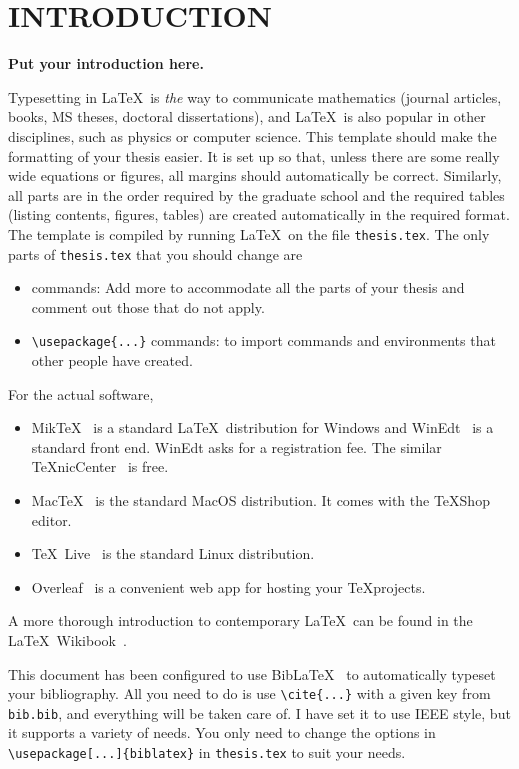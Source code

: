 
\chapter{INTRODUCTION}\label{chap1:introduction}

{\bf Put your introduction here.}


Typesetting in \LaTeX \ is {\em the} way to communicate mathematics
(journal articles, books, MS theses, doctoral dissertations),
and \LaTeX \ is also popular in other disciplines, such as 
physics or computer science. This template should make the formatting
of your thesis easier. It is set up so that, unless there are some really
wide equations or figures, all margins should automatically be correct.
Similarly, all parts are in the order required by the graduate school and 
the required tables (listing contents, figures, tables)
are created automatically in the required format. 
The template is compiled by running \LaTeX \ on 
the file \verb+thesis.tex+. The only parts of 
\verb+thesis.tex+ that you should change are
\begin{itemize}
	\item \verb++ commands: Add more to accommodate all the
	parts of your thesis and comment out those that do not apply. 
	\item \verb+\usepackage{...}+ commands: to import commands
	and environments that other people have created.
\end{itemize}

\newpage
For the actual software,
\begin{itemize}
	\item Mik\TeX~\cite{MiKTeX}
	is a standard \LaTeX\ distribution for Windows and
	WinEdt~\cite{WinEdt} is a standard front end.
	WinEdt asks for a registration fee. 
	The similar \TeX nicCenter~\cite{TeXnicCenter}
	is free. 
	\item Mac\TeX~\cite{MacTeX} is the standard MacOS distribution.
	It comes with the \TeX Shop editor.
	\item \TeX\ Live~\cite{TeXLive} is the standard Linux distribution.
	\item Overleaf~\cite{overleaf} is a convenient web app for hosting your
	\TeX projects.
\end{itemize}
A more thorough introduction to contemporary \LaTeX\ can be
found in the \LaTeX\ Wikibook~\cite{Wikibook}.

This document has been configured to use Bib\LaTeX~\cite{biblatex} to
automatically typeset your bibliography. All you need to do is use
\verb+\cite{...}+ with a given key from \verb+bib.bib+, and everything
will be taken care of. I have set it to use IEEE style, but it supports
a variety of needs. You only need to change the options in 
\verb+\usepackage[...]{biblatex}+ in \verb+thesis.tex+ to suit your needs.